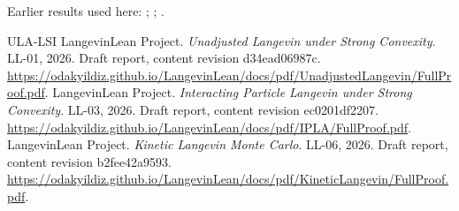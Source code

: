 \documentclass[11pt,a4paper]{article}
\begin{document}
Earlier results used here: \cite[Section~3.33.6]{LangevinLean2026ULASC}; \cite[Section~3.1.1]{LangevinLean2026IPLA}; \cite[Section~3.12.2]{LangevinLean2026Kinetic}.

\begin{thebibliography}{ULA-LSI}
LangevinLean Project. \emph{Unadjusted Langevin under Strong Convexity}. LL-01, 2026. Draft report, content revision d34ead06987c. \url{https://odakyildiz.github.io/LangevinLean/docs/pdf/UnadjustedLangevin/FullProof.pdf}.
LangevinLean Project. \emph{Interacting Particle Langevin under Strong Convexity}. LL-03, 2026. Draft report, content revision ec0201df2207. \url{https://odakyildiz.github.io/LangevinLean/docs/pdf/IPLA/FullProof.pdf}.
LangevinLean Project. \emph{Kinetic Langevin Monte Carlo}. LL-06, 2026. Draft report, content revision b2fee42a9593. \url{https://odakyildiz.github.io/LangevinLean/docs/pdf/KineticLangevin/FullProof.pdf}.
\end{thebibliography}
\end{document}
